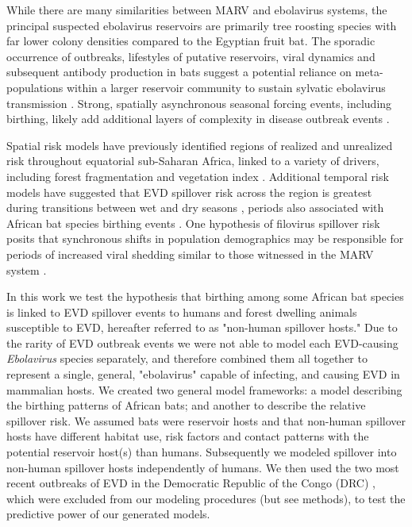 \documentclass[a4paper,twoside, onecolumn]{article}
\begin{document}
	While there are many similarities between MARV and ebolavirus systems, the principal suspected ebolavirus reservoirs are primarily tree roosting species with far lower colony densities compared to the Egyptian fruit bat. The sporadic occurrence of outbreaks, lifestyles of putative reservoirs, viral dynamics and subsequent antibody production in bats \cite{Swanepoel1996} suggest a potential reliance on meta-populations within a larger reservoir community to sustain sylvatic ebolavirus transmission \cite{Brown2013, Grenfell2001, Han2016, Hassanin2016}. Strong, spatially asynchronous seasonal forcing events, including birthing, likely add additional layers of complexity in disease outbreak events \cite{Duke-Sylvester2011}.\par
	Spatial risk models have previously identified regions of realized and unrealized risk throughout equatorial sub-Saharan Africa, linked to a variety of drivers, including forest fragmentation and vegetation index \cite{Rulli2017,Pigott2014, Pigott2016}. Additional temporal risk models have suggested that EVD spillover risk across the region is greatest during transitions between wet and dry seasons \cite{Schmidt2017}, periods also associated with African bat species birthing events \cite{Cumming1997}. One hypothesis of filovirus spillover risk posits that synchronous shifts in population demographics may be responsible for periods of increased viral shedding similar to those witnessed in the MARV system \cite{Hayman2015, Pourrut2009}.\par 
	In this work we test the hypothesis that birthing among some African bat species is linked to EVD spillover events to humans and forest dwelling animals susceptible to EVD, hereafter referred to as "non-human spillover hosts." Due to the rarity of EVD outbreak events we were not able to model each EVD-causing \textit{Ebolavirus} species separately, and therefore combined them all together to represent a single, general, "ebolavirus" capable of infecting, and causing EVD in mammalian hosts. We created two general model frameworks: a model describing the birthing patterns of African bats; and another to describe the relative spillover risk. We assumed bats were reservoir hosts and that non-human spillover hosts have different habitat use, risk factors and contact patterns with the potential reservoir host(s) than humans. Subsequently we modeled spillover into non-human spillover hosts independently of humans. We then used the two most recent outbreaks of EVD in the Democratic Republic of the Congo (DRC) \cite{Barry2018, WHO2018}, which were excluded from our modeling procedures (but see methods), to test the predictive power of our generated models. \par
\end{document}
